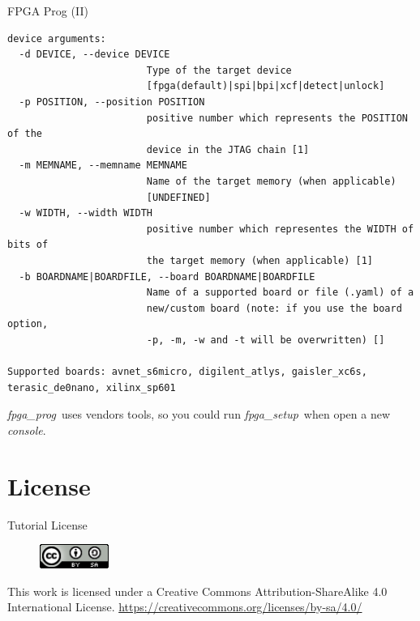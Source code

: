 \documentclass{beamer}
\newcommand{\fpgasetup}      {\textit{fpga\_setup}}
\newcommand{\fpgaprog}       {\textit{fpga\_prog}}
\newcommand{\console}        {\textit{console}}
\begin{document}
\begin{frame}[fragile]{FPGA Prog (II)}
  \tiny
  \begin{verbatim}
device arguments:
  -d DEVICE, --device DEVICE
                        Type of the target device
                        [fpga(default)|spi|bpi|xcf|detect|unlock]
  -p POSITION, --position POSITION
                        positive number which represents the POSITION of the
                        device in the JTAG chain [1]
  -m MEMNAME, --memname MEMNAME
                        Name of the target memory (when applicable)
                        [UNDEFINED]
  -w WIDTH, --width WIDTH
                        positive number which representes the WIDTH of bits of
                        the target memory (when applicable) [1]
  -b BOARDNAME|BOARDFILE, --board BOARDNAME|BOARDFILE
                        Name of a supported board or file (.yaml) of a
                        new/custom board (note: if you use the board option,
                        -p, -m, -w and -t will be overwritten) []

Supported boards: avnet_s6micro, digilent_atlys, gaisler_xc6s,
terasic_de0nano, xilinx_sp601
  \end{verbatim}
  \begin{alertblock}{}
    \small
    \fpgaprog\ uses vendors tools, so you could run \fpgasetup\ when open
    a new \console.
  \end{alertblock}
\end{frame}


\section{License}

\begin{frame}{Tutorial License}
  \begin{figure}[!t]
    \includegraphics[width=0.2\textwidth]{../images/cc-by-sa.png}
  \end{figure}
  \centering
  This work is licensed under a Creative Commons Attribution-ShareAlike 4.0 International License.
  \url{https://creativecommons.org/licenses/by-sa/4.0/}
\end{frame}
\end{document}
